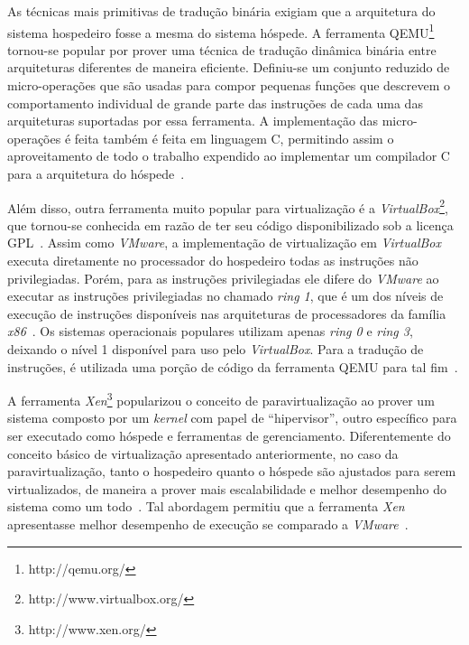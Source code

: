 As técnicas mais primitivas de tradução binária exigiam que a arquitetura
do sistema hospedeiro fosse a mesma do sistema hóspede. A ferramenta
QEMU\footnote{http://qemu.org/} tornou-se popular por prover uma técnica de
tradução dinâmica binária entre arquiteturas diferentes de maneira
eficiente. Definiu-se um conjunto reduzido de micro-operações que
são usadas para compor pequenas funções que descrevem o comportamento
individual de grande parte das instruções de cada uma das arquiteturas
suportadas por essa ferramenta. A implementação das micro-operações é feita
também é feita em linguagem C, permitindo assim o aproveitamento de todo o
trabalho expendido ao implementar um compilador C para a arquitetura do
hóspede~\cite{bellard2005qemu}.

Além disso, outra ferramenta muito popular para virtualização é a
\emph{VirtualBox}\footnote{http://www.virtualbox.org/}, que tornou-se conhecida
em razão de ter seu código disponibilizado sob a licença
GPL~\cite{watson2008virtualbox}. Assim como \emph{VMware}, a implementação de
virtualização em \emph{VirtualBox} executa diretamente no processador do
hospedeiro todas as instruções não privilegiadas. Porém, para as instruções
privilegiadas ele difere do \emph{VMware} ao executar as instruções
privilegiadas no chamado \emph{ring 1}, que é um dos níveis de execução de
instruções disponíveis nas arquiteturas de processadores da família
\emph{x86}~\cite{uhlig2005intel}. Os sistemas operacionais populares utilizam
apenas \emph{ring 0} e \emph{ring 3}, deixando o nível 1 disponível para uso
pelo \emph{VirtualBox}. Para a tradução de instruções, é utilizada uma porção
de código da ferramenta QEMU para tal fim~\cite{virtualboxTech}.

A ferramenta \emph{Xen}\footnote{http://www.xen.org/} popularizou o conceito de
paravirtualização ao prover um sistema composto por um \emph{kernel} com papel
de “hipervisor”, outro específico para ser executado como hóspede e ferramentas
de gerenciamento. Diferentemente do conceito básico de virtualização
apresentado anteriormente, no caso da paravirtualização, tanto o hospedeiro
quanto o hóspede são ajustados para serem virtualizados, de maneira a prover
mais escalabilidade e melhor desempenho do sistema como um
todo~\cite{whitaker2002denali}. Tal abordagem permitiu que a ferramenta
\emph{Xen} apresentasse melhor desempenho de execução se comparado a
\emph{VMware}~\cite{barham2003xen}.

